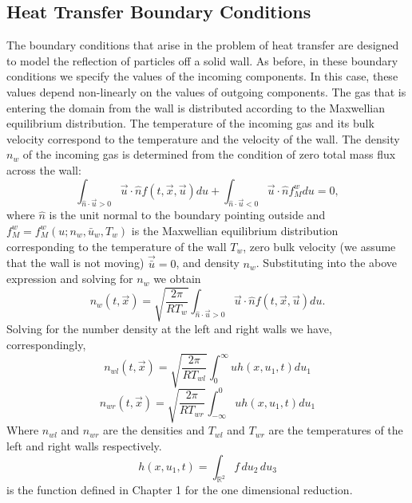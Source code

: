 \subsection{Heat Transfer Boundary Conditions}
The boundary conditions that arise in the problem of heat transfer are designed to model the reflection of particles off a solid wall. As before, in these boundary conditions we specify the values of the incoming components. In this case, these values depend non-linearly on the values of outgoing components. The gas that is entering the domain from the wall is distributed according to the Maxwellian equilibrium distribution. The temperature of the incoming gas and its bulk velocity correspond to the temperature and the velocity of the wall. The density $n_w$ of the incoming gas is determined from the condition of zero total mass flux across the wall:
%
\begin{equation}
\int_{\hat{n} \cdot \vec{u} > 0} \vec{u} \cdot \hat{n} f(t, \vec{x}, \vec{u}) du + \int_{\hat{n} \cdot \vec{u} < 0} \vec{u} \cdot \hat{n} f^{w}_{M} du = 0,
\end{equation}
%
where $\hat{n}$ is the unit normal to the boundary pointing outside and $f^{w}_{M}=f^{w}_{M}(u;n_{w},\bar{u}_{w},T_{w})$ is the Maxwellian equilibrium distribution corresponding to the temperature of the wall $T_{w}$, zero bulk velocity (we assume that the wall is not moving) $\vec{\bar{u}}=0$, and density $n_w$. Substituting into the above expression and solving for $n_{w}$ we obtain
%
\begin{equation*}
n_{w}(t, \vec{x})=\sqrt{ \frac{2 \pi}{R T_{w}}} \int_{\hat{n} \cdot \vec{u} > 0} \vec{u} \cdot \hat{n} f(t, \vec{x}, \vec{u}) du. 
\end{equation*}
%
Solving for the number density at the left and right walls we have, correspondingly,
%
\begin{equation*}
n_{wl}(t, \vec{x}) = \sqrt{ \frac{2 \pi}{R T_{wl}}} \int_{0}^{\infty} u h(x,u_1,t) du_1
\end{equation*}
%
\begin{equation*}
n_{wr}(t, \vec{x}) = \sqrt{ \frac{2 \pi}{R T_{wr}}} \int_{-\infty}^{0} u h(x,u_1,t) du_1
\end{equation*}
%
Where $n_{wl}$ and $n_{wr}$ are the densities and $T_{wl}$ and $T_{wr}$ are the temperatures of the left and right walls respectively.
%
\begin{equation*}
h(x,u_1,t) = \int_{\mathbb{R}^2} f \, du_2 \, du_3
\end{equation*}
%
is the function defined in Chapter 1 for the one dimensional reduction.
